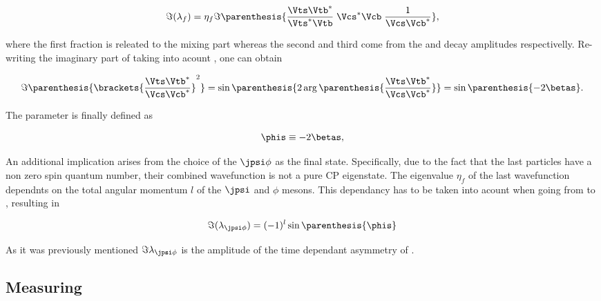 \begin{equation}
  \centering
 \Im(\lambda_f) = \eta_f \Im\parenthesis{ \frac{\Vts\Vtb^*}{\Vts^*\Vtb} \; \Vcs^*\Vcb \; \frac{1}{\Vcs\Vcb^*} },
 \label{lambdaf_ckm}
\end{equation}

\noindent where the first fraction is releated to the mixing part \qoverp whereas the second and third come from the \Bsb and \Bs
decay amplitudes respectivelly. Re-writing the imaginary part of  taking into acount ,
one can obtain 

\begin{equation}
  \centering
  \Im\parenthesis{ \brackets{ \frac{\Vts\Vtb^*}{\Vcs\Vcb^*}}^2 } =
  \sin \parenthesis{2 \arg \parenthesis{\frac{\Vts\Vtb^*}{\Vcs\Vcb^*}}} =
  \sin \parenthesis{-2\betas}.
 \label{lambda_ckm_manip}
\end{equation}

\noindent The parameter \phis is finally defined as

\begin{equation}
  \centering
  \phis\equiv-2\betas,
 \label{phis_def}
\end{equation}

\noindent An additional implication arises from the choice of the $\jpsi\phi$ as the final state.
Specifically, due to the fact that the last particles have a non zero spin quantum number, their combined wavefunction
is not a pure CP eigenstate. The eigenvalue $\eta_f$ of the last wavefunction dependnts on the total angular momentum
$l$ of the $\jpsi$ and $\phi$ mesons. This dependancy has to be taken into acount when going from 
to , resulting in 

\begin{equation}
 \Im(\lambda_{\jpsi\phi}) = (-1)^l\sin\parenthesis{\phis}
 \label{phis_jpsiphi_def}
\end{equation}

\noindent As it was previously mentioned $\Im\lambda_{\jpsi\phi}$ is the amplitude of the time dependant asymmetry of .


\subsection{Measuring \phis}
\label{measuring_phis}

